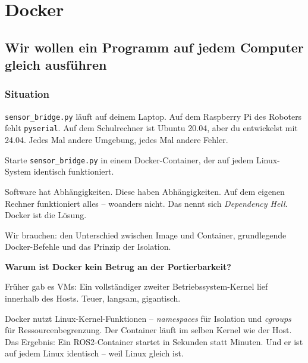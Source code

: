 \part{Docker}

\chapter{Wir wollen ein Programm auf jedem Computer gleich ausführen}

\kapitelstruktur

\section{Situation}

\texttt{sensor\_bridge.py} läuft auf deinem Laptop.
Auf dem Raspberry Pi des Roboters fehlt \texttt{pyserial}.
Auf dem Schulrechner ist Ubuntu 20.04, aber du entwickelst mit 24.04.
Jedes Mal andere Umgebung, jedes Mal andere Fehler.

\begin{aufgabeBox}
Starte \texttt{sensor\_bridge.py} in einem Docker-Container,
der auf jedem Linux-System identisch funktioniert.
\end{aufgabeBox}

\begin{problemBox}
Software hat Abhängigkeiten. Diese haben Abhängigkeiten.
Auf dem eigenen Rechner funktioniert alles -- woanders nicht.
Das nennt sich \textit{Dependency Hell}.
Docker ist die Lösung.
\end{problemBox}

\begin{wissenBox}
Wir brauchen: den Unterschied zwischen Image und Container,
grundlegende Docker-Befehle und das Prinzip der Isolation.
\end{wissenBox}

\begin{haubeBox}
\textbf{Warum ist Docker kein Betrug an der Portierbarkeit?}

Früher gab es VMs: Ein vollständiger zweiter Betriebssystem-Kernel
lief innerhalb des Hosts. Teuer, langsam, gigantisch.

Docker nutzt Linux-Kernel-Funktionen -- \textit{namespaces}
für Isolation und \textit{cgroups} für Ressourcenbegrenzung.
Der Container läuft im selben Kernel wie der Host.
Das Ergebnis: Ein ROS2-Container startet in Sekunden statt Minuten.
Und er ist auf jedem Linux identisch -- weil Linux gleich ist.
\end{haubeBox}

